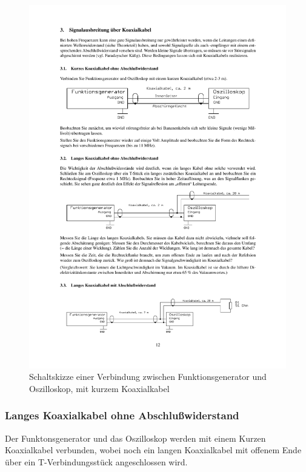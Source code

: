 \documentclass[12pt,a4paper]{article}
\begin{document}
\begin{figure}[H] 
  \centering
    \includegraphics[trim = 10mm 200mm 10mm 65mm, clip, scale = 1]{3-3_3.pdf}
  	\caption[Schaltskizze einer Verbindung zwischen Funktionsgenerator und Oszilloskop, mit kurzem Koaxialkabel]{Schaltskizze einer Verbindung zwischen Funktionsgenerator und Oszilloskop, mit kurzem Koaxialkabel\footnotemark}
  \label{fig:3.1}
\end{figure}

\subsubsection{Langes Koaxialkabel ohne Abschlußwiderstand}

Der Funktonsgenerator und das Oszilloskop werden mit einem Kurzen Koaxialkabel verbunden, wobei noch ein langen Koaxialkabel mit offenem Ende über ein T-Verbindungsstück angeschlossen wird.
\end{document}
